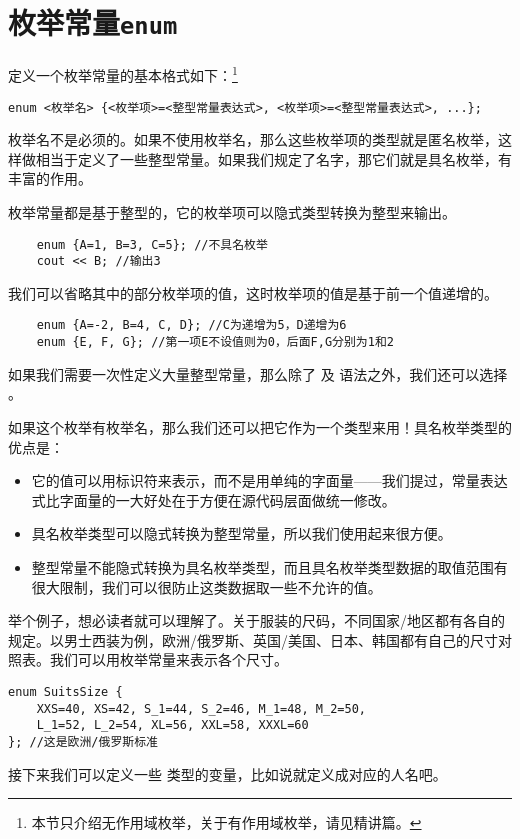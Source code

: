 \section{枚举常量\texttt{enum}}
定义一个枚举常量的基本格式如下：\footnote{本节只介绍无作用域枚举，关于有作用域枚举，请见精讲篇。}
\begin{lstlisting}
enum <枚举名> {<枚举项>=<整型常量表达式>, <枚举项>=<整型常量表达式>, ...};
\end{lstlisting}\par
枚举名不是必须的。如果不使用枚举名，那么这些枚举项的类型就是匿名枚举，这样做相当于定义了一些整型常量。如果我们规定了名字，那它们就是具名枚举，有丰富的作用。\par
枚举常量都是基于整型的，它的枚举项可以隐式类型转换为整型来输出。
\begin{lstlisting}
    enum {A=1, B=3, C=5}; //不具名枚举
    cout << B; //输出3
\end{lstlisting}
我们可以省略其中的部分枚举项的值，这时枚举项的值是基于前一个值递增的。
\begin{lstlisting}
    enum {A=-2, B=4, C, D}; //C为递增为5，D递增为6
    enum {E, F, G}; //第一项E不设值则为0，后面F,G分别为1和2
\end{lstlisting}
如果我们需要一次性定义大量整型常量，那么除了 \lstinline@const@ 及 \lstinline@constexpr@ 语法之外，我们还可以选择 \lstinline@enum@。\par
如果这个枚举有枚举名，那么我们还可以把它作为一个类型来用！具名枚举类型的优点是：
\begin{itemize}
    \item 它的值可以用标识符来表示，而不是用单纯的字面量——我们提过，常量表达式比字面量的一大好处在于方便在源代码层面做统一修改。
    \item 具名枚举类型可以隐式转换为整型常量，所以我们使用起来很方便。
    \item 整型常量不能隐式转换为具名枚举类型，而且具名枚举类型数据的取值范围有很大限制，我们可以很防止这类数据取一些不允许的值。
\end{itemize}
举个例子，想必读者就可以理解了。关于服装的尺码，不同国家/地区都有各自的规定。以男士西装为例，欧洲/俄罗斯、英国/美国、日本、韩国都有自己的尺寸对照表。我们可以用枚举常量来表示各个尺寸。
\begin{lstlisting}
enum SuitsSize {
    XXS=40, XS=42, S_1=44, S_2=46, M_1=48, M_2=50,
    L_1=52, L_2=54, XL=56, XXL=58, XXXL=60
}; //这是欧洲/俄罗斯标准
\end{lstlisting}
接下来我们可以定义一些 \lstinline@SuitsSize@ 类型的变量，比如说就定义成对应的人名吧。
